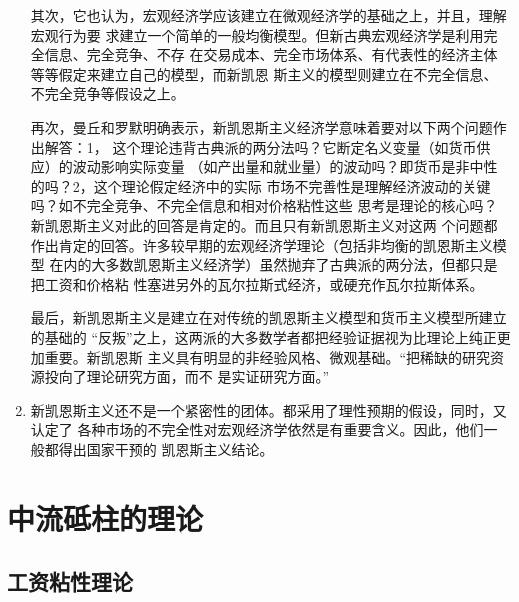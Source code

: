 \begin{enumerate}
  其次，它也认为，宏观经济学应该建立在微观经济学的基础之上，并且，理解宏观行为要
  求建立一个简单的一般均衡模型。但新古典宏观经济学是利用完全信息、完全竞争、不存
  在交易成本、完全市场体系、有代表性的经济主体等等假定来建立自己的模型，而新凯恩
  斯主义的模型则建立在不完全信息、不完全竞争等假设之上。

  再次，曼丘和罗默明确表示，新凯恩斯主义经济学意味着要对以下两个问题作出解答：1，
  这个理论违背古典派的两分法吗？它断定名义变量（如货币供应）的波动影响实际变量
  （如产出量和就业量）的波动吗？即货币是非中性的吗？2，这个理论假定经济中的实际
  市场不完善性是理解经济波动的关键吗？如不完全竞争、不完全信息和相对价格粘性这些
  思考是理论的核心吗？新凯恩斯主义对此的回答是肯定的。而且只有新凯恩斯主义对这两
  个问题都作出肯定的回答。许多较早期的宏观经济学理论（包括非均衡的凯恩斯主义模型
  在内的大多数凯恩斯主义经济学）虽然抛弃了古典派的两分法，但都只是把工资和价格粘
  性塞进另外的瓦尔拉斯式经济，或硬充作瓦尔拉斯体系。

  最后，新凯恩斯主义是建立在对传统的凯恩斯主义模型和货币主义模型所建立的基础的
  “反叛”之上，这两派的大多数学者都把经验证据视为比理论上纯正更加重要。新凯恩斯
  主义具有明显的非经验风格、微观基础。“把稀缺的研究资源投向了理论研究方面，而不
  是实证研究方面。”


\item 新凯恩斯主义还不是一个紧密性的团体。都采用了理性预期的假设，同时，又认定了
  各种市场的不完全性对宏观经济学依然是有重要含义。因此，他们一般都得出国家干预的
  凯恩斯主义结论。
\end{enumerate}

\section{中流砥柱的理论}

\subsection{工资粘性理论}

